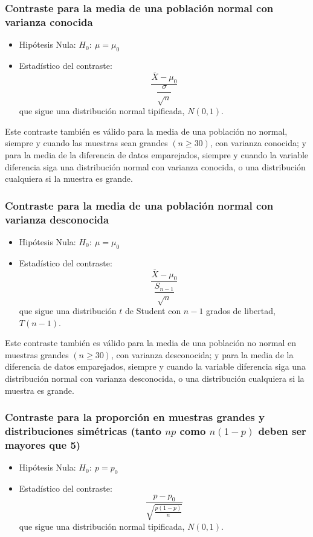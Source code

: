 \subsubsection{Contraste para la media de una población normal con varianza conocida}
\begin{itemize}
\item Hipótesis Nula: $H_0:\ \mu=\mu_0$
\item Estadístico del contraste:
\[
\dfrac{\overline{X}-\mu_0 }{\dfrac{\sigma }{\sqrt{n}}}
\]
que sigue una distribución normal tipificada, $N(0,1)$.
\end{itemize}
Este contraste también es válido para la media de una población no normal, siempre y cuando las muestras sean grandes
$(n\geq 30)$, con varianza conocida; y para la media de la diferencia de datos emparejados, siempre y cuando la variable
diferencia siga una distribución normal con varianza conocida, o una distribución cualquiera si la muestra es grande.

\subsubsection{Contraste para la media de una población normal con varianza desconocida}
\begin{itemize}
\item Hipótesis Nula: $H_0:\ \mu=\mu_0$
\item Estadístico del contraste:
\[
\dfrac{\overline{X}-\mu_0}{\dfrac{S_{n-1}}{\sqrt{n}}}
\]
que sigue una distribución $t$ de Student con $n-1$ grados de libertad, $T(n-1)$.
\end{itemize}
Este contraste también es válido para la media de una población no normal en muestras grandes $(n\geq 30)$, con varianza
desconocida; y para la media de la diferencia de datos emparejados, siempre y cuando la variable diferencia siga una
distribución normal con varianza desconocida, o una distribución cualquiera si la muestra es grande.

\subsubsection{Contraste para la proporción en muestras grandes y distribuciones simétricas (tanto $np$ como $n(1-p)$
deben ser mayores que 5)}
\begin{itemize}
\item Hipótesis Nula: $H_0:\ p=p_0$
\item Estadístico del contraste:
\[
\frac{{p - p_0 }}{{\sqrt {\frac{{p\left( {1 - p} \right)}}{n}} }}
\]
que sigue una distribución normal tipificada, $N(0,1)$.
\end{itemize}


